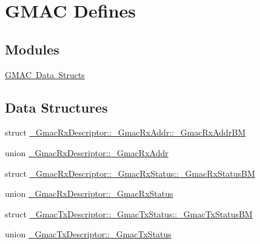 \hypertarget{group__gmac__defines}{}\section{G\+M\+AC Defines}
\label{group__gmac__defines}
\subsection*{Modules}
\begin{DoxyCompactItemize}
\item 
\mbox{\hyperlink{group__gmac__structs}{G\+M\+A\+C Data Structs}}
\end{DoxyCompactItemize}
\subsection*{Data Structures}
\begin{DoxyCompactItemize}
\item 
struct \mbox{\hyperlink{struct__GmacRxDescriptor_1_1__GmacRxAddr_1_1__GmacRxAddrBM}{\+\_\+\+Gmac\+Rx\+Descriptor\+::\+\_\+\+Gmac\+Rx\+Addr\+::\+\_\+\+Gmac\+Rx\+Addr\+BM}}
\item 
union \mbox{\hyperlink{union__GmacRxDescriptor_1_1__GmacRxAddr}{\+\_\+\+Gmac\+Rx\+Descriptor\+::\+\_\+\+Gmac\+Rx\+Addr}}
\item 
struct \mbox{\hyperlink{struct__GmacRxDescriptor_1_1__GmacRxStatus_1_1__GmacRxStatusBM}{\+\_\+\+Gmac\+Rx\+Descriptor\+::\+\_\+\+Gmac\+Rx\+Status\+::\+\_\+\+Gmac\+Rx\+Status\+BM}}
\item 
union \mbox{\hyperlink{union__GmacRxDescriptor_1_1__GmacRxStatus}{\+\_\+\+Gmac\+Rx\+Descriptor\+::\+\_\+\+Gmac\+Rx\+Status}}
\item 
struct \mbox{\hyperlink{struct__GmacTxDescriptor_1_1__GmacTxStatus_1_1__GmacTxStatusBM}{\+\_\+\+Gmac\+Tx\+Descriptor\+::\+\_\+\+Gmac\+Tx\+Status\+::\+\_\+\+Gmac\+Tx\+Status\+BM}}
\item 
union \mbox{\hyperlink{union__GmacTxDescriptor_1_1__GmacTxStatus}{\+\_\+\+Gmac\+Tx\+Descriptor\+::\+\_\+\+Gmac\+Tx\+Status}}
\end{DoxyCompactItemize}
